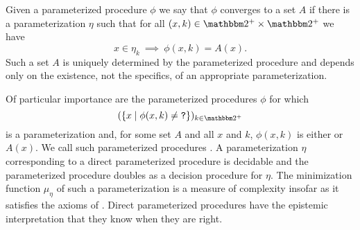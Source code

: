 Given a parameterized procedure $\phi$ we say that $\phi$ converges to a set $A$ if there is a parameterization $\eta$ such that for all $(x, k) \in \binary^+ \times \binary^+$ we have
\begin{equation*}
  x \in \eta_k \:\implies\: \phi(x, k) = A(x).
\end{equation*}
Such a set $A$ is uniquely determined by the parameterized procedure and depends only on the existence, not the specifics, of an appropriate parameterization.

Of particular importance are the parameterized procedures $\phi$ for which
\begin{equation*}
  (\{x \st \phi(x, k) \neq \bits{?}\})_{k \in \binary^+}
\end{equation*}
is a parameterization and, for some set $A$ and all $x$ and $k$, $\phi(x, k)$ is either  or $A(x)$.
We call such parameterized procedures .
A parameterization $\eta$ corresponding to a direct parameterized procedure is decidable and the parameterized procedure doubles as a decision procedure for $\eta$.
The minimization function $\mu_\eta$ of such a parameterization is a measure of complexity insofar as it satisfies the axioms of \textcite{blum1967machine}.
Direct parameterized procedures have the epistemic interpretation that they know when they are right.
